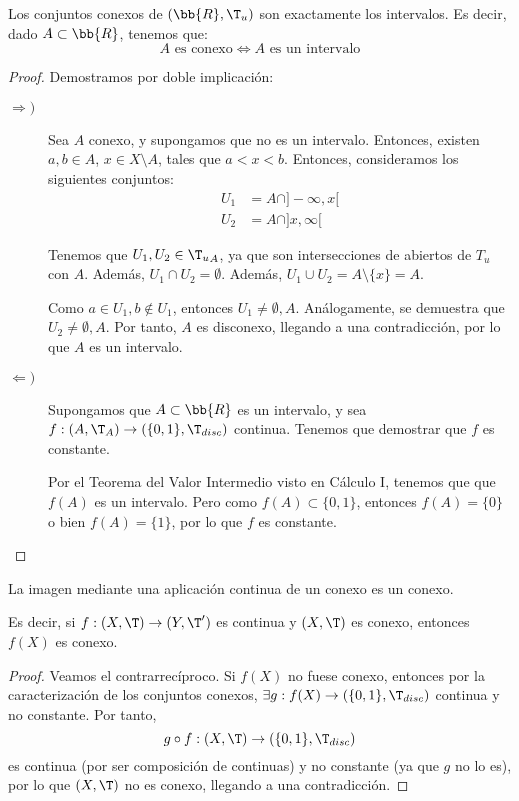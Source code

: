 \begin{prop}
    Los conjuntos conexos de $(\bb{R}, \T_u)$ son exactamente los intervalos. Es decir, dado $A\subset \bb{R}$, tenemos que:
    \begin{equation*}
        A \text{ es conexo} \Longleftrightarrow A \text{ es un intervalo}
    \end{equation*}
\end{prop}
\begin{proof}
    Demostramos por doble implicación:
    \begin{description}
        \item[$\Longrightarrow)$] Sea $A$ conexo, y supongamos que no es un intervalo. Entonces, existen $a,b\in A$, $x\in X\setminus A$, tales que $a<x<b$. Entonces, consideramos los siguientes conjuntos:
        \begin{align*}
            U_1 &= A\cap ]-\infty, x[ \\
            U_2 &= A\cap ]x, \infty[
        \end{align*}

        Tenemos que $U_1,U_2\in {\T_u}_A$, ya que son intersecciones de abiertos de $T_u$ con $A$.
        Además, $U_1\cap U_2=\emptyset$. Además, $U_1\cup U_2=A\setminus \{x\}=A$.

        Como $a\in U_1, b\notin U_1$, entonces $U_1\neq \emptyset, A$. Análogamente, se demuestra que $U_2\neq \emptyset, A$. Por tanto, $A$ es disconexo, llegando a una contradicción, por lo que $A$ es un intervalo.
        
        \item[$\Longleftarrow)$] Supongamos que $A\subset \bb{R}$ es un intervalo, y sea $f:(A,\T_A)\to \left(\{0,1\},\T_{disc}\right)$ continua. Tenemos que demostrar que $f$ es constante.
        
        Por el Teorema del Valor Intermedio visto en Cálculo I, tenemos que que $f(A)$ es un intervalo. Pero como $f(A)\subset \{0,1\}$, entonces $f(A)=\{0\}$ o bien $f(A)=\{1\}$, por lo que $f$ es constante.
    \end{description}
\end{proof}


\begin{teo}
    La imagen mediante una aplicación continua de un conexo es un conexo.
    
    Es decir, si $f:(X,\T)\to (Y,\T')$ es continua y $(X,\T)$ es conexo, entonces $f(X)$ es conexo.
\end{teo}
\begin{proof}
    Veamos el contrarrecíproco. Si $f(X)$ no fuese conexo, entonces por la caracterización de los conjuntos conexos, $\exists g:f(X)\to \left(\{0,1\},\T_{disc}\right)$ continua y no constante. Por tanto,
    \begin{equation*}
        g\circ f:(X,\T)\to \left(\{0,1\},\T_{disc}\right)
    \end{equation*}
    es continua (por ser composición de continuas) y no constante (ya que $g$ no lo es), por lo que $(X,\T)$ no es conexo, llegando a una contradicción.
\end{proof}


